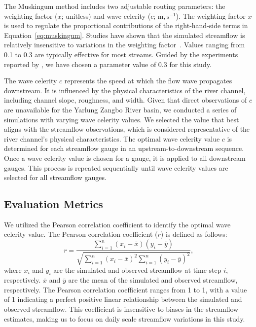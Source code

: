 \documentclass[draft]{agujournal2019}
\begin{document}
The Muskingum method includes two adjustable routing parameters: the weighting factor ($x$; unitless) and wave celerity ($c$; $\textrm{m},\textrm{s}^{-1}$). The weighting factor $x$ is used to regulate the proportional contributions of the right-hand-side terms in Equation~\ref{eq:muskingum}. Studies have shown that the simulated streamflow is relatively insensitive to variations in the weighting factor~\cite{koussis1978JHD}. Values ranging from 0.1 to 0.3 are typically effective for most streams. Guided by the experiments reported by , we have chosen a parameter value of 0.3 for this study.

The wave celerity $c$ represents the speed at which the flow wave propagates downstream. It is influenced by the physical characteristics of the river channel, including channel slope, roughness, and width. Given that direct observations of $c$ are unavailable for the Yarlung Zangbo River basin, we conducted a series of simulations with varying wave celerity values. We selected the value that best aligns with the streamflow observations, which is considered representative of the river channel's physical characteristics. The optimal wave celerity value $c$ is determined for each streamflow gauge in an upstream-to-downstream sequence. Once a wave celerity value is chosen for a gauge, it is applied to all downstream gauges. This process is repeated sequentially until wave celerity values are selected for all streamflow gauges.

\subsection{Evaluation Metrics}

We utilized the Pearson correlation coefficient to identify the optimal wave celerity value. The Pearson correlation coefficient ($r$) is defined as follows:
\begin{equation}
  r = \frac{\sum_{i=1}^{n} (x_i - \bar{x})(y_i - \bar{y})}{\sqrt{\sum_{i=1}^{n} (x_i - \bar{x})^2 \sum_{i=1}^{n} (y_i - \bar{y})^2}} \textrm{,}
\end{equation}
where $x_i$ and $y_i$ are the simulated and observed streamflow at time step $i$, respectively. $\bar{x}$ and $\bar{y}$ are the mean of the simulated and observed streamflow, respectively. The Pearson correlation coefficient ranges from \textminus{}1 to 1, with a value of 1 indicating a perfect positive linear relationship between the simulated and observed streamflow. This coefficient is insensitive to biases in the streamflow estimates, making us to focus on daily scale streamflow variations in this study.
\end{document}
